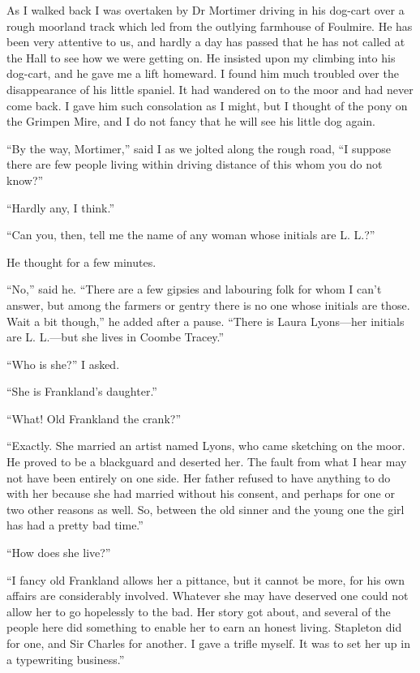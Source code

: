 \documentclass[paper=a5,BCOR=7mm,twoside,DIV=calc,12pt,usegeometry,openany,chapterprefix,endperiod,headings=big]{scrbook} %
\begin{document}
As I walked back I was overtaken by Dr Mortimer driving in his dog-cart over a rough moorland track which led from the outlying farmhouse of Foulmire. He has been very attentive to us, and hardly a day has passed that he has not called at the Hall to see how we were getting on. He insisted upon my climbing into his dog-cart, and he gave me a lift homeward. I found him much troubled over the disappearance of his little spaniel. It had wandered on to the moor and had never come back. I gave him such consolation as I might, but I thought of the pony on the Grimpen Mire, and I do not fancy that he will see his little dog again.

\enquote{By the way, Mortimer,} said I as we jolted along the rough road, \enquote{I suppose there are few people living within driving distance of this whom you do not know?}

\enquote{Hardly any, I think.}

\enquote{Can you, then, tell me the name of any woman whose initials are L. L.?}

He thought for a few minutes.

\enquote{No,} said he. \enquote{There are a few gipsies and labouring folk for whom I can't answer, but among the farmers or gentry there is no one whose initials are those. Wait a bit though,} he added after a pause. \enquote{There is Laura Lyons---her initials are L. L.---but she lives in Coombe Tracey.}

\enquote{Who is she?} I asked.

\enquote{She is Frankland's daughter.}

\enquote{What! Old Frankland the crank?}

\enquote{Exactly. She married an artist named Lyons, who came sketching on the moor. He proved to be a blackguard and deserted her. The fault from what I hear may not have been entirely on one side. Her father refused to have anything to do with her because she had married without his consent, and perhaps for one or two other reasons as well. So, between the old sinner and the young one the girl has had a pretty bad time.}

\enquote{How does she live?}

\enquote{I fancy old Frankland allows her a pittance, but it cannot be more, for his own affairs are considerably involved. Whatever she may have deserved one could not allow her to go hopelessly to the bad. Her story got about, and several of the people here did something to enable her to earn an honest living. Stapleton did for one, and Sir Charles for another. I gave a trifle myself. It was to set her up in a typewriting business.}
\end{document}
